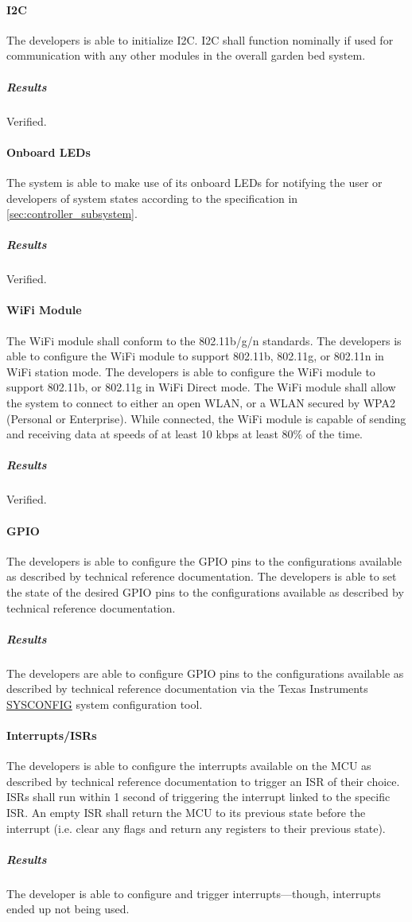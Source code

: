 \paragraph{I2C} The developers is able to initialize I2C. I2C shall
function nominally if used for communication with any other modules in the
overall garden bed system.
\subparagraph{Results} Verified.

\paragraph{Onboard LEDs} The system is able to make use of its onboard
LEDs for notifying the user or developers of system states according to the specification in \autoref{sec:controller_subsystem}.
\subparagraph{Results} Verified.

\paragraph{WiFi Module} The WiFi module shall conform to the 802.11b/g/n
standards. The developers is able to configure the WiFi
module to support 802.11b, 802.11g, or 802.11n in WiFi station mode.  The 
developers is able to configure the WiFi module to support 802.11b, or
802.11g in WiFi Direct mode. The WiFi module shall allow the system to
connect to either an open WLAN, or a WLAN secured by WPA2 (Personal or
Enterprise). While
connected, the WiFi module is capable of sending and receiving
data at speeds of at least 10 kbps at least 80\% of the time.
\subparagraph{Results} Verified.

\paragraph{GPIO} The developers is able to configure the GPIO pins to
the configurations available as described by technical reference documentation.
The developers is able to set the state of the desired GPIO pins to
the configurations available as described by technical reference documentation.
\subparagraph{Results} The developers are able to configure GPIO pins to the configurations available as described by technical reference documentation via the Texas Instruments \href{https://www.ti.com/tool/SYSCONFIG}{SYSCONFIG} system configuration tool.

\paragraph{Interrupts/ISRs} The developers is able to configure
the interrupts available on the MCU as described by technical reference
documentation to trigger an ISR of their choice. ISRs shall run within 1 second
of triggering the interrupt linked to the specific ISR. An empty ISR shall
return the MCU to its previous state before the interrupt (i.e. clear any
flags and return any registers to their previous state).
\subparagraph{Results} The developer is able to configure and trigger interrupts---though, interrupts ended up not being used.

